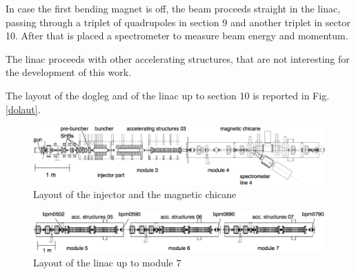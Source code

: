 In case the first bending magnet is off, the beam proceeds straight in the linac, passing through a triplet of quadrupoles in section 9 and another triplet in sector 10. After that is placed a spectrometer to measure beam energy and momentum. 

The linac proceeds with other accelerating structures, that are not interesting for the development of this work.

The layout of the dogleg and of the linac up to section 10 is reported in Fig. \ref{dolaut}.


\begin{landscape}
\begin{center}

\begin{figure}
\centering 
\includegraphics[width=23cm,keepaspectratio]{pictures/Injector}
\caption{Layout of the injector and the magnetic chicane}
\label{injlayout}
\end{figure}

\vspace{20mm}

\begin{figure}
\centering 
\includegraphics[width=23cm,keepaspectratio]{pictures/girder5-7}
\caption{Layout of the linac up to module 7}
\label{linaclayout}
\end{figure}

\end{center}
\end{landscape}



